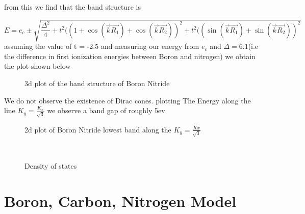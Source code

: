 \documentclass[a4paper]{article}
\begin{document}
from this we find that the band structure is

\begin{equation}
E = e_{c}  \pm  \sqrt{\frac{\Delta^2}{4} +t^2 ((1 + \cos(\vec{k}\vec{R_{1}}) + \cos(\vec{k}\vec{R_{2}}) )^2  + t^2 (( \sin(\vec{k}\vec{R_{1}}) + \sin(\vec{k}\vec{R_{2}}) )^2  }
\end{equation}
assuming the value of t = -2.5 and measuring our energy from $e_{c}$ and $\Delta = 6.1$(i.e the difference in first ionization energies between Boron and nitrogen)
we obtain the plot shown below
\begin{figure}[h]

\centering
\caption{\label{fig:frog}3d plot of the band structure of Boron Nitride}
\end{figure}

We do not observe the existence of Dirac cones. plotting The Energy along the line $K_{y} = \frac{K_{x}}{\sqrt{3}}$ we observe a band gap of roughly 5ev
\begin{figure}[h]
\centering
\caption{\label{bn band}2d plot of Boron Nitride lowest band along the $K_{y}=\frac{K{x}}{\sqrt{3}}$ }
\end{figure}\\


\begin{figure}[h]
\centering
\caption{\label{bn density}Density of states }
\end{figure}

\newpage
\section{Boron, Carbon, Nitrogen Model}
\end{document}
